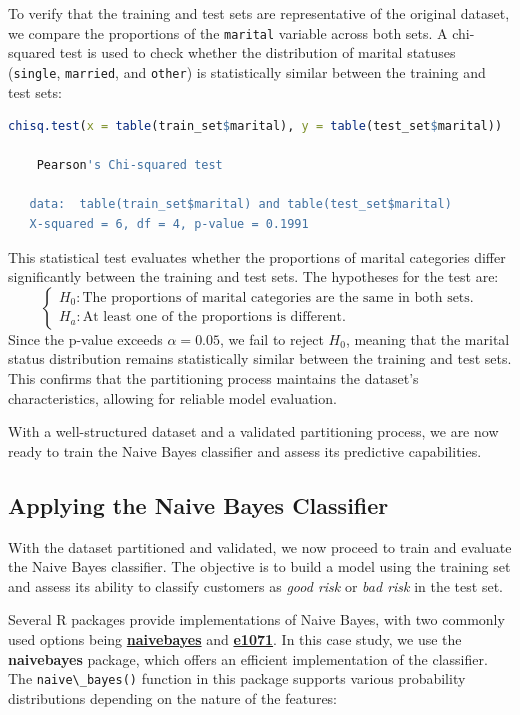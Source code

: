 \documentclass[
  11pt,
]{book}
\newcommand{\passthrough}[1]{#1}
\theoremstyle{definition}
\theoremstyle{definition}
\theoremstyle{definition}
\theoremstyle{definition}
\theoremstyle{remark}
\begin{document}
To verify that the training and test sets are representative of the original dataset, we compare the proportions of the \passthrough{\lstinline!marital!} variable across both sets. A chi-squared test is used to check whether the distribution of marital statuses (\passthrough{\lstinline!single!}, \passthrough{\lstinline!married!}, and \passthrough{\lstinline!other!}) is statistically similar between the training and test sets:

\begin{lstlisting}[language=R]
chisq.test(x = table(train_set$marital), y = table(test_set$marital))
   
    Pearson's Chi-squared test
   
   data:  table(train_set$marital) and table(test_set$marital)
   X-squared = 6, df = 4, p-value = 0.1991
\end{lstlisting}

This statistical test evaluates whether the proportions of marital categories differ significantly between the training and test sets. The hypotheses for the test are:\\
\[
\begin{cases}
H_0:  \text{The proportions of marital categories are the same in both sets.}\\
H_a:  \text{At least one of the proportions is different.}
\end{cases}
\]
Since the p-value exceeds \(\alpha = 0.05\), we fail to reject \(H_0\), meaning that the marital status distribution remains statistically similar between the training and test sets. This confirms that the partitioning process maintains the dataset's characteristics, allowing for reliable model evaluation.

With a well-structured dataset and a validated partitioning process, we are now ready to train the Naive Bayes classifier and assess its predictive capabilities.

\subsection*{Applying the Naive Bayes Classifier}\label{applying-the-naive-bayes-classifier}


With the dataset partitioned and validated, we now proceed to train and evaluate the Naive Bayes classifier. The objective is to build a model using the training set and assess its ability to classify customers as \emph{good risk} or \emph{bad risk} in the test set.

Several R packages provide implementations of Naive Bayes, with two commonly used options being \href{https://CRAN.R-project.org/package=naivebayes}{\textbf{naivebayes}} and \href{https://CRAN.R-project.org/package=e1071}{\textbf{e1071}}. In this case study, we use the \textbf{naivebayes} package, which offers an efficient implementation of the classifier. The \passthrough{\lstinline!naive\_bayes()!} function in this package supports various probability distributions depending on the nature of the features:
\end{document}
